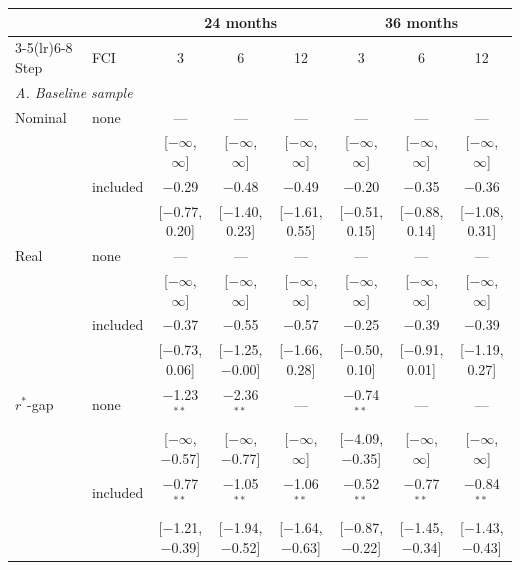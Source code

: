 \begin{tabular}{llcccccc}
\toprule
 & & \multicolumn{3}{c}{24 months} & \multicolumn{3}{c}{36 months}\\
\cmidrule(lr){3-5}\cmidrule(lr){6-8}
Step & FCI & 3 & 6 & 12 & 3 & 6 & 12 \\
\midrule
\multicolumn{8}{l}{\textit{A. Baseline sample}}\\
Nominal & none & --- & --- & --- & --- & --- & --- \\
 &  & {\scriptsize [$-\infty$, $\infty$]} & {\scriptsize [$-\infty$, $\infty$]} & {\scriptsize [$-\infty$, $\infty$]} & {\scriptsize [$-\infty$, $\infty$]} & {\scriptsize [$-\infty$, $\infty$]} & {\scriptsize [$-\infty$, $\infty$]} \\[2pt]
 & included & $-$0.29 & $-$0.48 & $-$0.49 & $-$0.20 & $-$0.35 & $-$0.36 \\
 &  & {\scriptsize [$-$0.77, 0.20]} & {\scriptsize [$-$1.40, 0.23]} & {\scriptsize [$-$1.61, 0.55]} & {\scriptsize [$-$0.51, 0.15]} & {\scriptsize [$-$0.88, 0.14]} & {\scriptsize [$-$1.08, 0.31]} \\[2pt]
Real & none & --- & --- & --- & --- & --- & --- \\
 &  & {\scriptsize [$-\infty$, $\infty$]} & {\scriptsize [$-\infty$, $\infty$]} & {\scriptsize [$-\infty$, $\infty$]} & {\scriptsize [$-\infty$, $\infty$]} & {\scriptsize [$-\infty$, $\infty$]} & {\scriptsize [$-\infty$, $\infty$]} \\[2pt]
 & included & $-$0.37 & $-$0.55 & $-$0.57 & $-$0.25 & $-$0.39 & $-$0.39 \\
 &  & {\scriptsize [$-$0.73, 0.06]} & {\scriptsize [$-$1.25, $-$0.00]} & {\scriptsize [$-$1.66, 0.28]} & {\scriptsize [$-$0.50, 0.10]} & {\scriptsize [$-$0.91, 0.01]} & {\scriptsize [$-$1.19, 0.27]} \\[2pt]
$r^*$-gap & none & $-$1.23$^{**}$ & $-$2.36$^{**}$ & --- & $-$0.74$^{**}$ & --- & --- \\
 &  & {\scriptsize [$-\infty$, $-$0.57]} & {\scriptsize [$-\infty$, $-$0.77]} & {\scriptsize [$-\infty$, $\infty$]} & {\scriptsize [$-$4.09, $-$0.35]} & {\scriptsize [$-\infty$, $\infty$]} & {\scriptsize [$-\infty$, $\infty$]} \\[2pt]
 & included & $-$0.77$^{**}$ & $-$1.05$^{**}$ & $-$1.06$^{**}$ & $-$0.52$^{**}$ & $-$0.77$^{**}$ & $-$0.84$^{**}$ \\
 &  & {\scriptsize [$-$1.21, $-$0.39]} & {\scriptsize [$-$1.94, $-$0.52]} & {\scriptsize [$-$1.64, $-$0.63]} & {\scriptsize [$-$0.87, $-$0.22]} & {\scriptsize [$-$1.45, $-$0.34]} & {\scriptsize [$-$1.43, $-$0.43]} \\[2pt]

\end{tabular}
